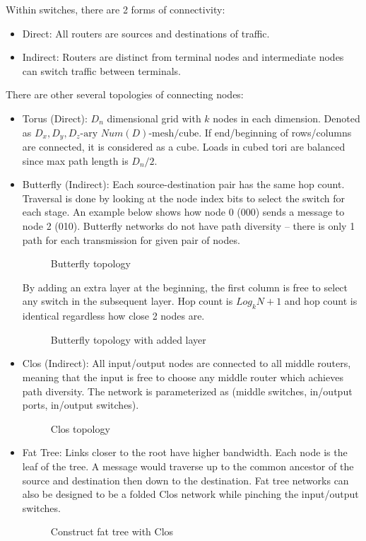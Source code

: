 \documentclass{article}
\begin{document}
\begin{multicols*}{2}
Within switches, there are 2 forms of connectivity:
\begin{itemize}
    \item Direct: All routers are sources and destinations of traffic.
    \item Indirect: Routers are distinct from terminal nodes and intermediate nodes can switch traffic between terminals.
\end{itemize}

There are other several topologies of connecting nodes:
\begin{itemize}
    \item Torus (Direct): $D_n$ dimensional grid with $k$ nodes in each dimension. Denoted as $D_x, D_y, D_z \text{-ary } Num(D) \text{-mesh/cube}$. If end/beginning of rows/columns are connected, it is considered as a cube. Loads in cubed tori are balanced since max path length is $D_n/2$.
    \item Butterfly (Indirect): Each source-destination pair has the same hop count. Traversal is done by looking at the node index bits to select the switch for each stage. An example below shows how node 0 (000) sends a message to node 2 (010). Butterfly networks do not have path diversity -- there is only 1 path for each transmission for given pair of nodes.
    \begin{figure}[H]
        \caption{Butterfly topology}
    \end{figure}
    \noindent
    By adding an extra layer at the beginning, the first column is free to select any switch in the subsequent layer. Hop count is $Log_kN+1$ and hop count is identical regardless how close 2 nodes are.
    \begin{figure}[H]
        \caption{Butterfly topology with added layer}
    \end{figure}    
    \item Clos (Indirect): All input/output nodes are connected to all middle routers, meaning that the input is free to choose any middle router which achieves path diversity. The network is parameterized as (middle switches, in/output ports, in/output switches).
    \begin{figure}[H]
        \caption{Clos topology}
    \end{figure}      
    \item Fat Tree: Links closer to the root have higher bandwidth. Each node is the leaf of the tree. A message would traverse up to the common ancestor of the source and destination then down to the destination. Fat tree networks can also be designed to be a folded Clos network while pinching the input/output switches.
    \begin{figure}[H]
        \caption{Construct fat tree with Clos}
    \end{figure}      
\end{itemize}


\end{multicols*}
\end{document}
